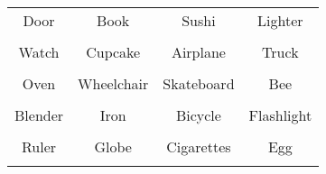 \documentclass[12pt,a4paper]{article}
\begin{document}
\thispagestyle{empty}
\begin{table}[]
\centering
\Huge
\begin{tabular}{cccc}
 Door& Book& Sushi& Lighter\\  & & & \\
 Watch& Cupcake& Airplane& Truck\\  & & & \\
 Oven& Wheelchair& Skateboard& Bee\\  & & & \\
 Blender& Iron& Bicycle& Flashlight\\  & & & \\
 Ruler& Globe& Cigarettes& Egg\\  & & & \\
\end{tabular}
\end{table}
\end{document}
